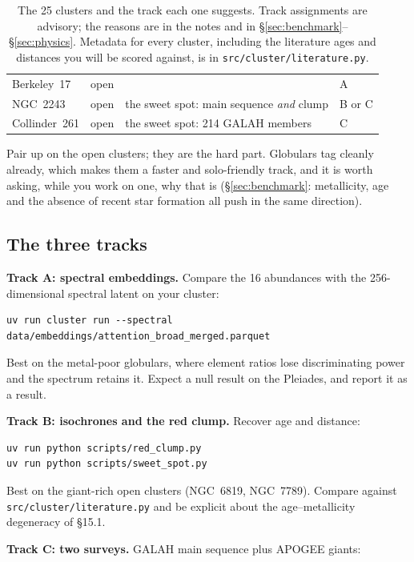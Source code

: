 \begin{table}[htbp]
\begin{tabular}{@{}llll@{}}
Berkeley~17 & open & & A \\ NGC~2243 & open & the sweet spot: main sequence
\emph{and} clump & B or C \\ Collinder~261 & open & the sweet spot: 214 GALAH
members & C \\ \bottomrule
\end{tabular}
\caption{The 25 clusters and the track each one suggests. Track assignments
are advisory; the reasons are in the notes and in
\S\ref{sec:benchmark}--\S\ref{sec:physics}. Metadata for every cluster,
including the literature ages and distances you will be scored against, is in
\texttt{src/cluster/literature.py}.}
\label{tab:assignment}
\end{table}

Pair up on the open clusters; they are the hard part. Globulars tag cleanly
already, which makes them a faster and solo-friendly track, and it is worth
asking, while you work on one, why that is (\S\ref{sec:benchmark}: metallicity,
age and the absence of recent star formation all push in the same direction).

\subsection{The three tracks}

\textbf{Track A: spectral embeddings.} Compare the 16 abundances with the
256-dimensional spectral latent on your cluster:

\begin{verbatim}
uv run cluster run --spectral data/embeddings/attention_broad_merged.parquet
\end{verbatim}

Best on the metal-poor globulars, where element ratios lose discriminating
power and the spectrum retains it. Expect a null result on the Pleiades, and
report it as a result.

\textbf{Track B: isochrones and the red clump.} Recover age and distance:

\begin{verbatim}
uv run python scripts/red_clump.py
uv run python scripts/sweet_spot.py
\end{verbatim}

Best on the giant-rich open clusters (NGC~6819, NGC~7789). Compare against
\texttt{src/cluster/literature.py} and be explicit about the age--metallicity
degeneracy of \S 15.1.

\textbf{Track C: two surveys.} GALAH main sequence plus APOGEE giants:

